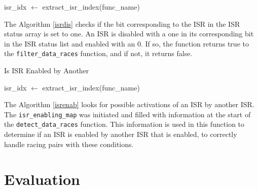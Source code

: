 \documentclass[
fancyheadings, %
%
%
]{stsreprt}
\begin{document}
{\begin{algorithm}[H]
	isr\_idx $\gets$ extract\_isr\_index(func\_name)\;
	\;
\end{algorithm}
\vspace{1cm}


The Algorithm \ref{isrdis} checks if the bit corresponding to the \ac{ISR} in the \Ac{ISR} status array is set to one. An \Ac{ISR} is disabled with a one in its corresponding bit in the \ac{ISR} status list and enabled with an 0. If so, the function returns true to the \texttt{filter\_data\_races} function, and if not, it returns false. 
\vspace{1cm}

\begin{algorithm}[H]
	\label{isrenab}
	\caption{Is ISR Enabled by Another}
	\DontPrintSemicolon
	\SetAlgoLined
	\BlankLine
	
	isr\_idx $\gets$ extract\_isr\_index(func\_name)\;
	\;
\end{algorithm}
\vspace{1cm}

The Algorithm \ref{isrenab} looks for possible activations of an \ac{ISR} by another \ac{ISR}. The \texttt{isr\_enabling\_map} was initiated and filled with information at the start of the \texttt{detect\_data\_races} function. This information is used in this function to determine if an \ac{ISR} is enabled by another \ac{ISR} that is enabled, to correctly handle racing pairs with these conditions.

\chapter{Evaluation}

}
\end{document}
